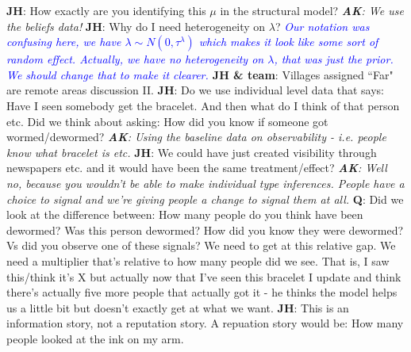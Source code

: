 \documentclass{article}
\begin{document}
\newline
\newline
\textbf{JH}: How exactly are you identifying this $\mu$ in the structural model?
\emph{\textbf{AK}: We use the beliefs data!}
\textbf{JH}:  Why do I need heterogeneity on $\lambda$?
\emph{
    \textcolor{blue}{
        Our notation was confusing here, we have $\lambda \sim N(0, \tau^\lambda)$ which 
        makes it look like some sort of random effect. Actually, we have no heterogeneity on 
        $\lambda$, that was just the prior. We should change that to make it clearer.
    } 
}
\newline
\newline
\textbf{JH \& team}: Villages assigned ``Far" are remote areas discussion II. 
\newline
\newline
\textbf{JH}: Do we use individual level data that says: Have I seen somebody get the 
bracelet. And then what do I think of that person etc. Did we think about asking: How did 
you know if someone got wormed/dewormed? 
\emph{\textbf{AK}: Using the baseline data on observability - i.e. people know what 
bracelet is etc.}
\newline
\newline
\textbf{JH}: We could have just created visibility through newspapers etc. and it 
would have been the same treatment/effect?
\emph{\textbf{AK}: Well no, because you wouldn't be able to make individual type inferences. 
People have a choice to signal and we're giving people a change to signal them at all.} 
\newline
\newline
\textbf{Q}: Did we look at the difference between: How many people do you think 
have been dewormed? Was this person dewormed? How did you know they were dewormed? Vs did you 
observe one of these signals? We need to get at this relative gap. We need a multiplier 
that's relative to how many people did we see. That is, I saw this/think it's X but actually 
now that I've seen this bracelet I update and think there's actually five more people 
that actually got it - he thinks the model helps us a little bit but doesn't exactly get 
at what we want.
\textbf{JH}: This is an information story, not a reputation story. A repuation 
story would be: How many people looked at the ink on my arm.
\end{document}
